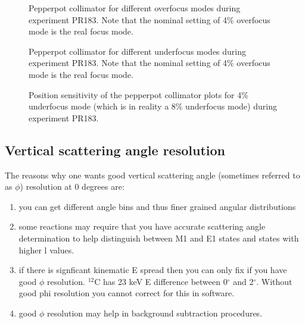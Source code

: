 \documentclass[11pt]{report}
\begin{document}
\begin{figure}[!h]
\centerline{\vspace{0cm}\hspace{0cm}
}
\centering
\caption{Pepperpot collimator for different overfocus modes during
experiment PR183. Note that the nominal setting of 4\% overfocus mode
is the real focus mode.}
\label{fig:pr183over}
\end{figure} 


\begin{figure}[!h]
\centerline{\vspace{0cm}\hspace{0cm}
}
\centering
\caption{Pepperpot collimator for different underfocus modes during
experiment PR183. Note that the nominal setting of 4\% overfocus mode
is the real focus mode.}
\label{fig:pr183under}
\end{figure} 


\begin{figure}[!h]
\centerline{\vspace{0cm}\hspace{0cm}
}
\centering
\caption{Position sensitivity of the pepperpot collimator plots 
for 4\% underfocus mode (which is in reality a
8\% underfocus mode) during experiment PR183.}
\label{fig:pr183underXsensitivity}
\end{figure} 






\subsection{Vertical scattering angle resolution}
The reasons why one wants good vertical scattering angle (sometimes
referred to as $\phi$) resolution at 0 degrees are:
\begin{enumerate}
\item you can get different angle bins and thus finer grained angular distributions
\item some reactions may require that you have accurate scattering angle determination to help
distinguish between M1 and E1 states and states with higher l values.
\item if there is signficant kinematic E spread then you can only fix if you have
   good $\phi$ resolution. $^{12}$C has 23 keV E difference between 0$^{\circ}$ and 2$^{\circ}$.
   Without good phi resolution you cannot correct for this in software.
\item good $\phi$ resolution may help in background subtraction procedures.
\end{enumerate}
\end{document}
